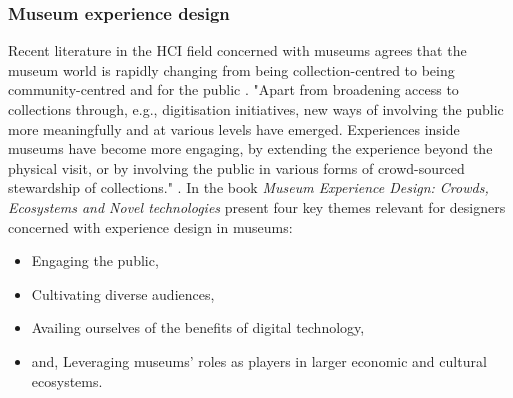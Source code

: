 \subsubsection{Museum experience design}
Recent literature in the HCI field concerned with museums agrees that the museum world is rapidly changing from being collection-centred to being community-centred and for the public \autocite[p. 1]{vermeeren_museum_2018}. "Apart from broadening access to collections through, e.g., digitisation initiatives, new ways of involving the public more meaningfully and at various levels have emerged. Experiences inside museums have become more engaging, by extending the experience beyond the physical visit, or by involving the public in various forms of crowd-sourced stewardship of collections." \autocite[p. 1]{vermeeren_museum_2018}. In the book \emph{Museum Experience Design: Crowds, Ecosystems and Novel technologies} \autocite{vermeeren_museum_2018} present four key themes relevant for designers concerned with experience design in museums: 
\begin{itemize}
    \item Engaging the public,
    \item Cultivating diverse audiences,
    \item Availing ourselves of the benefits of digital technology,
    \item and, Leveraging museums’ roles as players in larger economic and cultural ecosystems.
\end{itemize}

